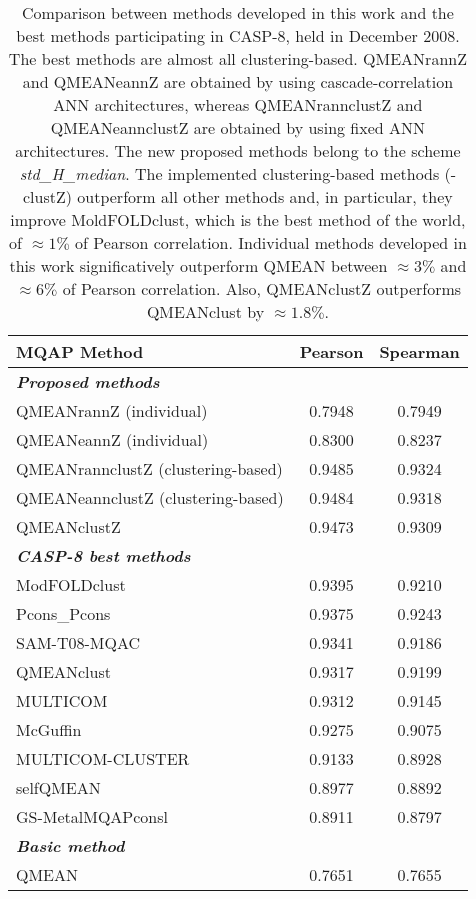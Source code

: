 \begin{table}[htbp]
\center
\begin{tabular}{lcc}
\toprule                %
\textbf{MQAP Method} & \textbf{Pearson} & \textbf{Spearman} \\
	\midrule                %
	\emph{\textbf{Proposed methods}} &&\\
	QMEANrannZ (individual) &0.7948	&0.7949\\	
 	QMEANeannZ (individual) &0.8300 &0.8237\\
	QMEANrannclustZ (clustering-based) &0.9485	&0.9324\\	
	QMEANeannclustZ  (clustering-based) &0.9484	&0.9318\\	
	QMEANclustZ	&0.9473	&0.9309\\		
	\midrule                %
	\emph{\textbf{CASP-8 best methods}} &&\\	
 	ModFOLDclust	&0.9395	&0.9210\\
 	Pcons\_Pcons	&0.9375	&0.9243\\	
 	SAM-T08-MQAC	&0.9341	&0.9186\\
	QMEANclust	&0.9317	&0.9199\\
 	MULTICOM	&0.9312	&0.9145\\
 	McGuffin	&0.9275	&0.9075\\
 	MULTICOM-CLUSTER	&0.9133	&0.8928\\
 	selfQMEAN	&0.8977	&0.8892\\	
 	GS-MetalMQAPconsl	&0.8911	&0.8797\\
	\midrule                %
	\emph{\textbf{Basic method}} & &\\
	QMEAN	&0.7651	&0.7655\\
\bottomrule                %
\end{tabular}
\caption[Comparison of the best methods participating in CASP-8]{Comparison between methods developed in this work and the best methods participating in CASP-8, held in December 2008. The best methods are almost all clustering-based. QMEANrannZ and QMEANeannZ are obtained by using ca\-sca\-de-\-cor\-re\-la\-tion ANN architectures, whereas QMEANrannclustZ and QMEANeannclustZ are obtained by using fixed ANN architectures. The new proposed methods belong to the scheme \emph{std\_H\_median}. The implemented clustering-based methods (-clustZ) outperform all other methods and, in particular, they improve MoldFOLDclust, which is the best method of the world, of $\approx 1\%$ of Pearson correlation. Individual methods developed in this work significatively outperform QMEAN between $\approx 3\%$ and $\approx 6\%$ of Pearson correlation. Also, QMEANclustZ outperforms QMEANclust by $\approx 1.8\%$.}
\label{tab:casp8_comparison}
\end{table}


